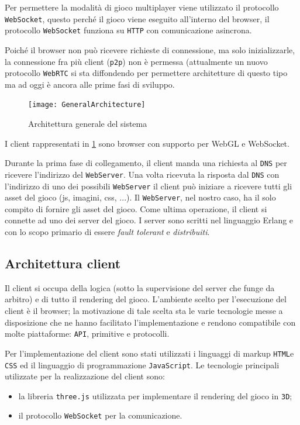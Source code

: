 \documentclass[paper=a4, fontsize=11pt]{scrartcl} %
\numberwithin{equation}{section} %
\numberwithin{figure}{section} %
\numberwithin{table}{section} %
\begin{document}
Per permettere la modalità di gioco multiplayer viene utilizzato il protocollo \texttt{WebSocket}, questo perché il gioco viene eseguito all'interno del browser, il protocollo \texttt{WebSocket}
funziona su \texttt{HTTP} con comunicazione asincrona.

Poiché il browser non può ricevere richieste di connessione, ma solo inizializzarle, la connessione fra più client (\texttt{p2p}) non è permessa (attualmente un nuovo protocollo \texttt{WebRTC} si sta
diffondendo per permettere architetture di questo tipo ma ad oggi è ancora alle prime fasi di sviluppo.

\begin{figure}
\centering
\texttt{[image: GeneralArchitecture]}
\caption{Architettura generale del sistema}
\label{GenArc}
\end{figure}

I client rappresentati in \ref{GenArc} sono browser con supporto per WebGL e WebSocket.

Durante la prima fase di collegamento, il client manda una richiesta al \texttt{DNS} per ricevere l'indirizzo del \texttt{WebServer}.
Una volta ricevuta la risposta dal \texttt{DNS} con l'indirizzo di uno dei possibili \texttt{WebServer} il client può iniziare a ricevere tutti gli asset del gioco (js, imagini, css, ...). Il \texttt{WebServer}, nel nostro caso, ha il solo compito di fornire gli asset del gioco. Come ultima operazione, il client si connette ad uno dei server del gioco. I server sono scritti nel linguaggio Erlang e con lo scopo primario di essere \textit{fault tolerant} e \textit{distribuiti}.


\subsection{Architettura client}
Il client si occupa della logica (sotto la supervisione del server che funge da arbitro) e di tutto il rendering del gioco.
L'ambiente scelto per l'esecuzione del client è il browser; la motivazione di tale scelta sta le varie tecnologie messe a disposizione che ne hanno facilitato l'implementazione e rendono compatibile con molte piattaforme: \texttt{API}, primitive e protocolli.

Per l'implementazione del client sono stati utilizzati i linguaggi di markup \texttt{HTML}e \texttt{CSS} ed il linguaggio di programmazione \texttt{JavaScript}.
Le tecnologie principali utilizzate per la realizzazione del client sono:
\begin{itemize}
\item la libreria \texttt{three.js} \cite{threejs} utilizzata per implementare il rendering del gioco in \texttt{3D};
\item il protocollo \texttt{WebSocket} \cite{websocket} per la comunicazione.
\end{itemize}
\end{document}
